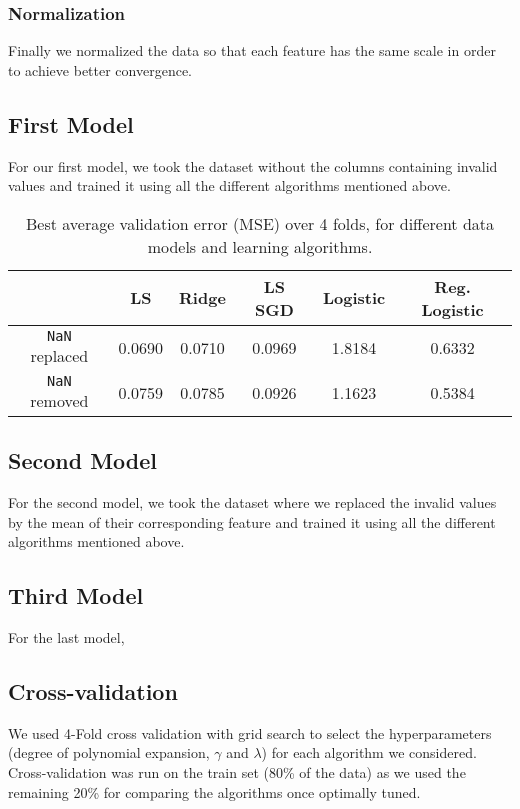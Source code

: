 \documentclass[10pt,conference,compsocconf]{IEEEtran}
\begin{document}
\subsubsection{Normalization}
Finally we normalized the data so that each feature has the same scale in order to achieve better convergence.

\subsection{First Model}
For our first model, we took the dataset without the columns containing invalid values and trained it using all the different algorithms mentioned above. \\
\begin{table}[h!]
  \begin{tabular}{ |c|c|c|c|c|c| } 
    \hline
     & LS & Ridge & LS SGD & Logistic & Reg. Logistic \\
    \hline
    \texttt{NaN} replaced & 0.0690 & 0.0710 & 0.0969 & 1.8184 & 0.6332 \\
    \texttt{NaN} removed  & 0.0759 & 0.0785 & 0.0926 & 1.1623 & 0.5384 \\
    \hline
  \end{tabular}

  \caption{Best average validation error (MSE) over 4 folds, for different data models and learning algorithms.}
  \label{tbl:validation}
\end{table}

\subsection{Second Model}
For the second model, we took the dataset where we replaced the invalid values by the mean of their corresponding feature and trained it using all the different algorithms mentioned above.

\subsection{Third Model}
For the last model,

\subsection{Cross-validation}
We used 4-Fold cross validation with grid search to select the hyperparameters (degree of polynomial expansion, $\gamma$ and $\lambda$) for each algorithm we considered. Cross-validation was run on the train set (80\% of the data) as we used the remaining 20\% for comparing the algorithms once optimally tuned.
\end{document}
